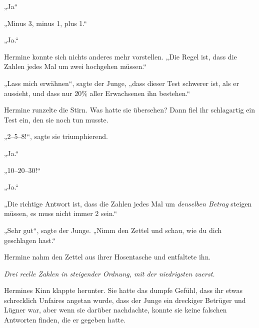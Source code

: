 „Ja“

„Minus 3, minus 1, plus 1.“

„Ja.“

Hermine konnte sich nichts anderes mehr vorstellen. „Die Regel ist, dass die Zahlen jedes Mal um zwei hochgehen müssen.“

„Lass mich erwähnen“, sagte der Junge, „dass dieser Test schwerer ist, als er aussieht, und dass nur 20\% aller Erwachsenen ihn bestehen.“

Hermine runzelte die Stirn. Was hatte sie übersehen? Dann fiel ihr schlagartig ein Test ein, den sie noch tun musste.

„2–5–8!“, sagte sie triumphierend.

„Ja.“

„10–20–30!“

„Ja.“

„Die richtige Antwort ist, dass die Zahlen jedes Mal um \emph{denselben Betrag} steigen müssen, es muss nicht immer 2 sein.“

„Sehr gut“, sagte der Junge. „Nimm den Zettel und schau, wie du dich geschlagen hast.“

Hermine nahm den Zettel aus ihrer Hosentasche und entfaltete ihn.

\emph{Drei reelle Zahlen in steigender Ordnung, mit der niedrigsten zuerst.}

Hermines Kinn klappte herunter. Sie hatte das dumpfe Gefühl, dass ihr etwas schrecklich Unfaires angetan wurde, dass der Junge ein dreckiger Betrüger und Lügner war, aber wenn sie darüber nachdachte, konnte sie keine falschen Antworten finden, die er gegeben hatte.

